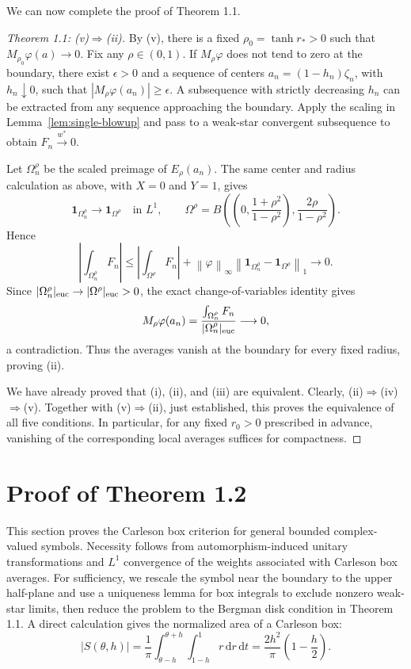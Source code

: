 \documentclass[12pt,a4paper]{article}
\theoremstyle{remark}
\newcommand{\dd}{\,\mathrm d}
\newcommand{\norm}[1]{\left\lVert#1\right\rVert}
\begin{document}
We can now complete the proof of Theorem 1.1.
\begin{proof}[Theorem 1.1: \textnormal{(v)}$\Rightarrow$\textnormal{(ii)}]
By \textnormal{(v)}, there is a fixed $\rho_0=\tanh r_*>0$ such that
$M_{\rho_0}\varphi(a)\to0$. Fix any $\rho\in(0,1)$.
If $M_\rho\varphi$ does not tend to zero at the boundary, there exist $\epsilon>0$ and a sequence of centers
$a_n=(1-h_n)\zeta_n$, with $h_n\downarrow0$, such that
$|M_\rho\varphi(a_n)|\ge\epsilon$.
A subsequence with strictly decreasing $h_n$ can be extracted from any sequence approaching the boundary.
Apply the scaling in Lemma~\ref{lem:single-blowup} and pass to a weak-star convergent subsequence to obtain $F_n\overset{w^*}\to0$.

Let $\Omega_n^\rho$ be the scaled preimage of $E_\rho(a_n)$.
The same center and radius calculation as above, with $X=0$ and $Y=1$, gives
\[
\mathbf1_{\Omega_n^\rho}\longrightarrow\mathbf1_{\Omega^\rho}\quad\text{in }L^1,
\qquad
\Omega^\rho=B\left(\left(0,\frac{1+\rho^2}{1-\rho^2}\right),
\frac{2\rho}{1-\rho^2}\right).
\]
Hence
\[
\left|\int_{\Omega_n^\rho}F_n\right|
\le\left|\int_{\Omega^\rho}F_n\right|
+\norm\varphi_\infty\norm{\mathbf1_{\Omega_n^\rho}-\mathbf1_{\Omega^\rho}}_1\longrightarrow0.
\]
Since $|\Omega_n^\rho|_{\rm euc}\to|\Omega^\rho|_{\rm euc}>0$, the exact change-of-variables identity gives
\[
M_\rho\varphi(a_n)=
\frac{\int_{\Omega_n^\rho}F_n}{|\Omega_n^\rho|_{\rm euc}}\longrightarrow0,
\]
a contradiction. Thus the averages vanish at the boundary for every fixed radius, proving \textnormal{(ii)}.

We have already proved that \textnormal{(i)}, \textnormal{(ii)}, and \textnormal{(iii)} are equivalent.
Clearly, \textnormal{(ii)}$\Rightarrow$\textnormal{(iv)}$\Rightarrow$\textnormal{(v)}.
Together with \textnormal{(v)}$\Rightarrow$\textnormal{(ii)}, just established, this proves the equivalence of all five conditions.
In particular, for any fixed $r_0>0$ prescribed in advance, vanishing of the corresponding local averages suffices for compactness.
\end{proof}
\section{Proof of Theorem 1.2}\label{sec:carleson}
This section proves the Carleson box criterion for general bounded complex-valued symbols.
Necessity follows from automorphism-induced unitary transformations and $L^1$ convergence of the weights associated with Carleson box averages.
For sufficiency, we rescale the symbol near the boundary to the upper half-plane and use a uniqueness lemma for box integrals to exclude nonzero weak-star limits,
then reduce the problem to the Bergman disk condition in Theorem 1.1.
A direct calculation gives the normalized area of a Carleson box:
\begin{equation}\label{eq:boxarea}
|S(\theta,h)|=\frac1\pi\int_{\theta-h}^{\theta+h}\int_{1-h}^1r\dd r\dd t
=\frac{2h^2}{\pi}\left(1-\frac h2\right).
\end{equation}
\end{document}
